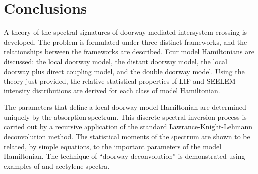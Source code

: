 \chapter{Conclusions}



A theory of the spectral signatures of doorway-mediated intersystem
crossing is developed.  The problem is formulated under three distinct
frameworks, and the relationships between the frameworks are
described.  Four model Hamiltonians are discussed: the local doorway
model, the distant doorway model, the local doorway plus direct
coupling model, and the double doorway model.  Using the theory just
provided, the relative statistical properties of LIF and SEELEM
intensity distributions are derived for each class of model
Hamiltonian.



The parameters that define a local doorway model Hamiltonian are
determined uniquely by the absorption spectrum.  This discrete
spectral inversion process is carried out by a recursive application
of the standard Lawrance-Knight-Lehmann deconvolution method.  The
statistical moments of the spectrum are shown to be related, by simple
equations, to the important parameters of the model Hamiltonian.  The
technique of ``doorway deconvolution'' is demonstrated using examples
of  and acetylene spectra.

